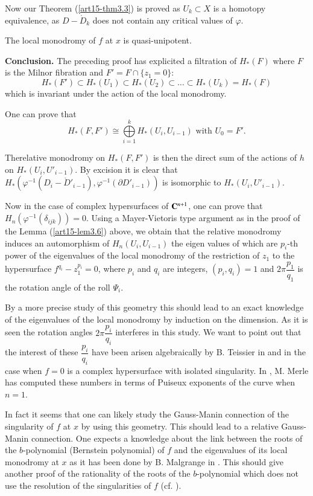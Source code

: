 Now our Theorem (\ref{art15-thm3.3}) is proved as $U_k \subset X$ is a homotopy equivalence, as $D - \mathring{D}_k$ does not contain any critical values of $\varphi$.

\setcounter{lemma}{7}
\begin{corollary}\label{art15-coro3.8}
The local monodromy of $f$ at $x$ is quasi-unipotent.
\end{corollary}

\noindent
{\bf Conclusion.}
The preceding proof has explicited a filtration of $H_* (F)$ where $F$ is the Milnor fibration and $F' = F \cap \{z_1 = 0\}$:
$$
H_* (F') \subset H_* (U_1) \subset H_* (U_2) \subset \ldots \subset H_* (U_k) = H_* (F)
$$
which is invariant under the action of the local monodromy.

One can prove that 
$$
H_* (F,F') \cong \bigoplus\limits^k_{i=1} H_* (U_i, U_{i-1}) \text{ with } U_0 = F'.
$$

The\pageoriginale relative monodromy on $H_* (F,F')$ is then the direct sum of the actions of $h$ on $H_* (U_i, U'_{i-1})$. By excision it is clear that $H_* (\varphi^{-1} (D_i - \mathring{D}'_{i-1}), \varphi^{-1} (\partial D'_{i-1}))$ is isomorphic to $H_* (U_i, U'_{i-1})$.

Now in the case of complex hypersurfaces of $\mathbf{C}^{n+1}$, one can prove that $H_n (\varphi^{-1} (\delta_{ijk})) =0$. Using a Mayer-Vietoris type argument as in the proof of the Lemma (\ref{art15-lem3.6}) above, we obtain that the relative monodromy induces an automorphism of $H_n(U_i, U_{i-1})$ the eigen values of which are $p_i$-th power of the eigenvalues of the local monodromy of the restriction of $z_1$ to the hypersurface $f^{q_i} - z^{p_i}_1 =0$, where $p_i$ and $q_i$ are integers, $(p_i, q_i) =1 $ and $2\pi \dfrac{p_1}{q_1}$ is the rotation angle of the roll $\Psi_i$.

By a more precise study of this geometry this should lead to an exact knowledge of the eigenvalues of the local monodromy by induction on the dimension. As it is seen the rotation angles $2\pi \dfrac{p_i}{q_i}$ interferes in this study. We want to point out that the interest of these $\dfrac{p_i}{q_i}$ have been arisen algebraically by B. Teissier in \cite{art15-key12} and \cite{art15-key13} in the case when $f=0$ is a complex hypersurface with isolated singularity. In \cite{art15-key10}, M. Merle has computed these numbers in terms of Puiseux exponents of the curve when $n=1$.

In fact it seems that one can likely study the Gauss-Manin connection of the singularity of $f$ at $x$ by using this geometry. This should lead to a relative Gauss-Manin connection. One expects a knowledge about the link between the roots of the $b$-polynomial (Bernstein polynomial) of $f$ and the eigenvalues of its local monodromy at $x$ as it has been done by B. Malgrange in \cite{art15-key9}. This should give another proof of the rationality of the roots of the $b$-polynomial  which does not use the resolution of the singularities of $f$ (cf. \cite{art15-key4}).

